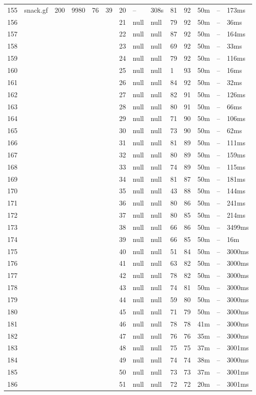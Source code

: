 \documentclass{article}
\begin{document}
\begin{longtable}{|l |l |l |l |l |l |l |l |l |l |l |l |l |l |}
155&snack.gf&200&9980&76&39&20&--&308s&81&92&50m&--&173ms\\
156&&&&&&21&null&null&79&92&50m&--&36ms\\
157&&&&&&22&null&null&87&92&50m&--&164ms\\
158&&&&&&23&null&null&69&92&50m&--&33ms\\
159&&&&&&24&null&null&79&92&50m&--&116ms\\
160&&&&&&25&null&null&1&93&50m&--&16ms\\
161&&&&&&26&null&null&84&92&50m&--&32ms\\
162&&&&&&27&null&null&82&91&50m&--&126ms\\
163&&&&&&28&null&null&80&91&50m&--&66ms\\
164&&&&&&29&null&null&71&90&50m&--&106ms\\
165&&&&&&30&null&null&73&90&50m&--&62ms\\
166&&&&&&31&null&null&81&89&50m&--&111ms\\
167&&&&&&32&null&null&80&89&50m&--&159ms\\
168&&&&&&33&null&null&74&89&50m&--&115ms\\
169&&&&&&34&null&null&81&87&50m&--&181ms\\
170&&&&&&35&null&null&43&88&50m&--&144ms\\
171&&&&&&36&null&null&80&86&50m&--&241ms\\
172&&&&&&37&null&null&80&85&50m&--&214ms\\
173&&&&&&38&null&null&66&86&50m&--&3499ms\\
174&&&&&&39&null&null&66&85&50m&--&16m\\
175&&&&&&40&null&null&51&84&50m&--&3000ms\\
176&&&&&&41&null&null&63&82&50m&--&3000ms\\
177&&&&&&42&null&null&78&82&50m&--&3000ms\\
178&&&&&&43&null&null&74&81&50m&--&3000ms\\
179&&&&&&44&null&null&59&80&50m&--&3000ms\\
180&&&&&&45&null&null&71&79&50m&--&3000ms\\
181&&&&&&46&null&null&78&78&41m&--&3000ms\\
182&&&&&&47&null&null&76&76&35m&--&3000ms\\
183&&&&&&48&null&null&75&75&37m&--&3001ms\\
184&&&&&&49&null&null&74&74&38m&--&3000ms\\
185&&&&&&50&null&null&73&73&37m&--&3001ms\\
186&&&&&&51&null&null&72&72&20m&--&3001ms\\

\end{longtable}
\end{document}
